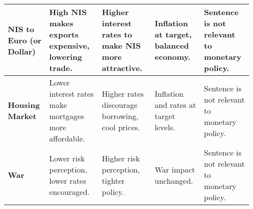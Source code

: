 \begin{longtable}{p{}p{}p{}p{}p{}}
\textbf{NIS to Euro (or Dollar)} & 
High NIS makes exports expensive, lowering trade. & 
Higher interest rates to make NIS more attractive. & 
Inflation at target, balanced economy. & 
Sentence is not relevant to monetary policy. \\
\midrule

\textbf{Housing Market} & 
Lower interest rates make mortgages more affordable. & 
Higher rates discourage borrowing, cool prices. & 
Inflation and rates at target levels. & 
Sentence is not relevant to monetary policy. \\
\midrule

\textbf{War} & 
Lower risk perception, lower rates encouraged. & 
Higher risk perception, tighter policy. & 
War impact unchanged. & 
Sentence is not relevant to monetary policy. \\
\bottomrule
\end{longtable}

